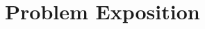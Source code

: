 \documentclass[12pt,a4paper,footinclude=true,twoside,headinclude=true]{report}
\begin{document}
    




\chapter{Problem Exposition}\label{sec:problem-exposition}






\end{document}
